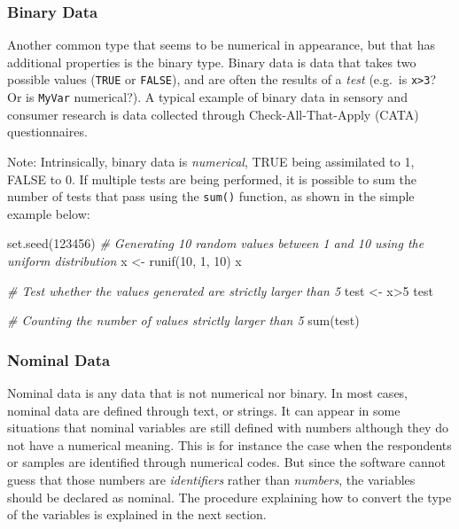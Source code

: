 \documentclass[
]{book}
\newenvironment{Shaded}{\begin{snugshade}}{\end{snugshade}}
\newcommand{\CommentTok}[1]{\textcolor[rgb]{0.56,0.35,0.01}{\textit{#1}}}
\newcommand{\DecValTok}[1]{\textcolor[rgb]{0.00,0.00,0.81}{#1}}
\newcommand{\FunctionTok}[1]{\textcolor[rgb]{0.00,0.00,0.00}{#1}}
\newcommand{\NormalTok}[1]{#1}
\newcommand{\OtherTok}[1]{\textcolor[rgb]{0.56,0.35,0.01}{#1}}
\newcommand{\SpecialCharTok}[1]{\textcolor[rgb]{0.00,0.00,0.00}{#1}}
\begin{document}
\hypertarget{binary-data}{%
\subsubsection{Binary Data}\label{binary-data}}

Another common type that seems to be numerical in appearance, but that has additional properties is the binary type.
Binary data is data that takes two possible values (\texttt{TRUE} or \texttt{FALSE}), and are often the results of a \emph{test} (e.g.~is \texttt{x\textgreater{}3}? Or is \texttt{MyVar} numerical?). A typical example of binary data in sensory and consumer research is data collected through Check-All-That-Apply (CATA) questionnaires.

Note: Intrinsically, binary data is \emph{numerical}, TRUE being assimilated to 1, FALSE to 0. If multiple tests are being performed, it is possible to sum the number of tests that pass using the \texttt{sum()} function, as shown in the simple example below:

\begin{Shaded}
\begin{Highlighting}[]
\FunctionTok{set.seed}\NormalTok{(}\DecValTok{123456}\NormalTok{)}
\CommentTok{\# Generating 10 random values between 1 and 10 using the uniform distribution}
\NormalTok{x }\OtherTok{\textless{}{-}} \FunctionTok{runif}\NormalTok{(}\DecValTok{10}\NormalTok{, }\DecValTok{1}\NormalTok{, }\DecValTok{10}\NormalTok{)}
\NormalTok{x}

\CommentTok{\# Test whether the values generated are strictly larger than 5}
\NormalTok{test }\OtherTok{\textless{}{-}}\NormalTok{ x}\SpecialCharTok{\textgreater{}}\DecValTok{5}
\NormalTok{test}

\CommentTok{\# Counting the number of values strictly larger than 5}
\FunctionTok{sum}\NormalTok{(test)}
\end{Highlighting}
\end{Shaded}

\hypertarget{nominal-data}{%
\subsubsection{Nominal Data}\label{nominal-data}}

Nominal data is any data that is not numerical nor binary. In most cases, nominal data are defined through text, or strings. It can appear in some situations that nominal variables are still defined with numbers although they do not have a numerical meaning. This is for instance the case when the respondents or samples are identified through numerical codes. But since the software cannot guess that those numbers are \emph{identifiers} rather than \emph{numbers}, the variables should be declared as nominal. The procedure explaining how to convert the type of the variables is explained in the next section.
\end{document}
